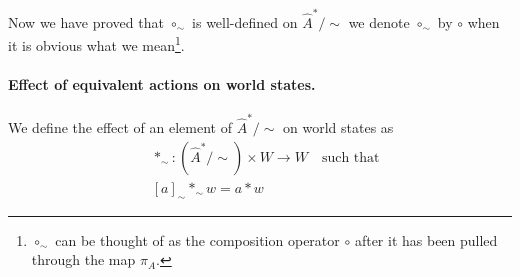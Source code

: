 Now we have proved that $\circ_{\sim}$ is well-defined on $\hat{A}^{\ast}/\sim$ we denote $\circ_{\sim}$ by $\circ$ when it is obvious what we mean\footnote{$\circ_{\sim}$ can be thought of as the composition operator $\circ$ after it has been pulled through the map $\pi_{A}$.}.

\paragraph{Effect of equivalent actions on world states.}
We define the effect of an element of  $\hat{A}^{\ast}/\sim$ on world states as
\begin{equation}
	\begin{aligned}
		 & \ast_{\sim}: (\hat{A}^{\ast}/\sim) \times W \to W \quad \text{such that} \\
		 & [a]_{\sim} \ast_{\sim} w = a \ast w
	\end{aligned}
\end{equation}

